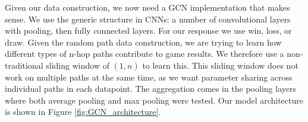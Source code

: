 Given our data construction, we now need a GCN implementation that makes sense. We use the generic structure in CNNs: a number of convolutional layers with pooling, then fully connected layers. For our response we use win, loss, or draw. Given the random path data construction, we are trying to learn how different types of n-hop paths contribute to game results. We therefore use a non-traditional sliding window of $(1,n)$ to learn this. This sliding window does not work on multiple paths at the same time, as we want parameter sharing across individual paths in each datapoint. The aggregation comes in the pooling layers where both average pooling and max pooling were tested. Our model architecture is shown in Figure \ref{fig:GCN_architecture}.





